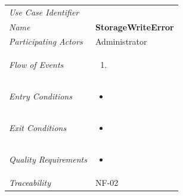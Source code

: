 \documentclass[12pt,letterpaper]{article}
\begin{document}
\begin{center}
	\begin{tabu} to 
		\toprule
		Use Case Identifier & \storagewriteerror{} \\
		Name & {\bf StorageWriteError} \\
		Participating Actors & Administrator \\
		Flow of Events & 
	    \begin{enumerate}[topsep=-1em,leftmargin=*]
		    \item 
		\end{enumerate} \\

		Entry Conditions &
		\begin{itemize}[topsep=-1em,leftmargin=*]
		    \item 
        \end{itemize} \\

		Exit Conditions &
		\begin{itemize}[topsep=-1em,leftmargin=*]
		    \item 
        \end{itemize} \\

		Quality Requirements &
		\begin{itemize}[topsep=-1em,leftmargin=*]
		    \item 
        \end{itemize} \\

		Traceability & NF-02 \\
		\toprule
	\end{tabu}
\end{center}
\end{document}
